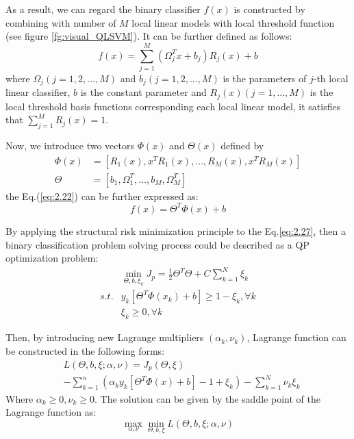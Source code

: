 \documentclass[master]{IPSstyle}
\begin{document}
{\begin{figure}[H]
\end{figure}
As a result, we can regard the binary classifier $f(x)$ is constructed by combining with number of $M$ local linear models with local threshold function (see figure \ref{fg:visual_QLSVM})\cite{bo2014quasi}. It can be further defined as follows:
\begin{equation}
f(x)=\sum_{j=1}^{M}\left(\Omega_j^Tx+b_j\right)R_j(x)+b \label{eq:2.24}
\end{equation}
where $\Omega_j(j=1,2,...,M)$ and $b_j(j=1,2,...,M)$ is the parameters of $j$-th local linear classifier, $b$ is the constant parameter and $R_j(x)(j=1,...,M)$ is the local threshold basis functions corresponding each local linear model, it satisfies that $\sum_{j=1}^MR_j(x) = 1$.

Now, we introduce two vectors $\Phi(x)$ and $\Theta(x)$ defined by
\begin{align}
\displaystyle\Phi(x)&=\left[R_1(x),x^TR_1(x),...,R_M(x),x^TR_M(x)\right] \label{eq:2.25}\\
\displaystyle\Theta&=\left[b_1,\Omega_1^T,...,b_M,\Omega_M^T\right]\label{eq:2.26}
\end{align}
the Eq.(\ref{eq:2.22}) can be further expressed as:
\begin{equation}
f(x)=\Theta^T\Phi(x)+b \label{eq:2.27}
\end{equation}

By applying the structural risk minimization principle to the Eq.\ref{eq:2.27}, then a binary classification problem solving process could be described as a QP optimization problem:
\begin{equation}\label{eq:2.28}
\begin{aligned}
&\min_{\Theta,b,\xi_k} J_p = \frac{1}{2}\Theta^T\Theta+C\sum_{k=1}^{N}\xi_k \\ 
s.t. &y_k\left[\Theta^T\Phi(x_k)+b\right]\geq1-\xi_k, \forall k  \\ 
&\xi_k\geq0, \forall k
\end{aligned} 
\end{equation}

Then, by introducing new Lagrange multipliers $(\alpha_k,\nu_k)$, Lagrange function can be constructed in the following forms:
\begin{equation}\label{eq:2.29}
\begin{aligned}
&L(\Theta,b,\xi;\alpha,\nu)=J_p\left(\Theta, \xi\right)\\
&-\sum_{k=1}^{n}\left(\alpha_ky_k\left[\Theta^T\Phi(x)+b\right]-1+\xi_k\right)-\sum_{k=1}^{N}\nu_k\xi_k
\end{aligned}
\end{equation}
Where $\alpha_k\geq0,\nu_k\geq0$. The solution can be given by the saddle point of the Lagrange function as:
\begin{equation}\label{eq:2.30}
\max_{\alpha,\nu}\min_{\Theta,b,\xi}L\left(\Theta,b,\xi;\alpha,\nu\right)
\end{equation}

}
\end{document}
